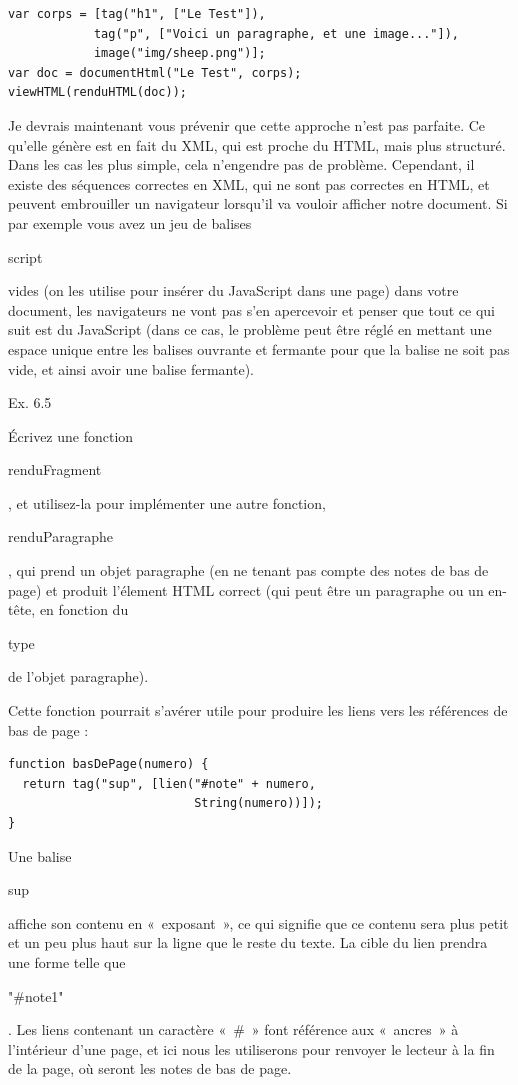 \documentclass{FramateX}
\renewcommand{\texttt}[1]{\begin{sffamily}{#1}\end{sffamily}}
\begin{document}
\begin{lstlisting}
var corps = [tag("h1", ["Le Test"]),
            tag("p", ["Voici un paragraphe, et une image..."]),
            image("img/sheep.png")];
var doc = documentHtml("Le Test", corps);
viewHTML(renduHTML(doc));
\end{lstlisting}
Je devrais maintenant vous prévenir que cette approche n'est pas
parfaite. Ce qu'elle génère est en fait du XML, qui est proche du HTML,
mais plus structuré. Dans les cas les plus simple, cela n'engendre pas
de problème. Cependant, il existe des séquences correctes en XML, qui ne
sont pas correctes en HTML, et peuvent embrouiller un navigateur
lorsqu'il va vouloir afficher notre document. Si par exemple vous avez
un jeu de balises \texttt{script} vides (on les utilise pour insérer du
JavaScript dans une page) dans votre document, les navigateurs ne vont
pas s'en apercevoir et penser que tout ce qui suit est du JavaScript
(dans ce cas, le problème peut être réglé en mettant une espace unique
entre les balises ouvrante et fermante pour que la balise ne soit pas
vide, et ainsi avoir une balise fermante).

\begin{center}\end{center}

Ex. 6.5

Écrivez une fonction \texttt{renduFragment}, et utilisez-la pour
implémenter une autre fonction, \texttt{renduParagraphe}, qui prend un
objet paragraphe (en ne tenant pas compte des notes de bas de page) et
produit l'élement HTML correct (qui peut être un paragraphe ou un
en-tête, en fonction du \texttt{type} de l'objet paragraphe).

Cette fonction pourrait s'avérer utile pour produire les liens vers les
références de bas de page :

\begin{lstlisting}
function basDePage(numero) {
  return tag("sup", [lien("#note" + numero,
                          String(numero))]);
}
\end{lstlisting}
Une balise \texttt{sup} affiche son contenu en «~exposant~», ce qui
signifie que ce contenu sera plus petit et un peu plus haut sur la ligne
que le reste du texte. La cible du lien prendra une forme telle que
\texttt{"\#note1"}. Les liens contenant un caractère «~\#~» font
référence aux «~ancres~» à l'intérieur d'une page, et ici nous les
utiliserons pour renvoyer le lecteur à la fin de la page, où seront les
notes de bas de page.
\end{document}
